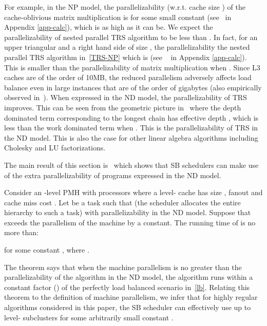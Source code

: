 For example, in the NP model, the parallelizability (w.r.t. cache size
) of the cache-oblivious matrix multiplication is  for some small constant 
(see~ in Appendix \ref{app-calc}), which is as high as
it can be. We expect the parallelizability of nested parallel TRS
algorithm to be less than . In fact, for an  upper triangular  and a right hand side  of size , the parallelizability the nested parallel TRS algorithm
in~\eqref{TRS-NP} which is  (see
~ in Appendix \ref{app-calc}). This is smaller than the
parallelizability of matrix multiplication when . Since L3
caches are of the order of 10MB, the reduced parallelism adversely
affects load balance even in large instances that are of the order of
gigabytes (also empirically observed in~\cite{SimhadriBlFi15}).  When
expressed in the ND model, the parallelizability of TRS improves.
This can be seen from the geometric picture
in~ where the depth dominated term
corresponding to the longest chain has effective depth
, which is less than the work
dominated term when .  This is the
parallelizability of TRS in the ND model.  This is also the case for
other linear algebra algorithms including Cholesky and LU
factorizations.

\vspace{3pt}
The main result of this section is~ which shows
that SB schedulers can make use of the extra parallelizability of
programs expressed in the ND model.
\begin{theorem}
\vspace{-3pt}
Consider an -level PMH with  processors where a level- cache
has size , fanout  and cache miss cost . Let  be a
task such that  (the scheduler allocates the
entire hierarchy to such a task) with parallelizability 
in the ND model. Suppose that  exceeds the parallelism
of the machine by a constant. The running time of  is no more than:

for some constant , where .
\label{thm:rt}
\end{theorem}

The theorem says that when the machine parallelism is no greater than
the parallelizability of the algorithm in the ND model, the algorithm
runs within a constant factor () of the perfectly load balanced
scenario in~\eqref{lb}.  Relating this theorem to the definition of
machine parallelism, we infer that for highly regular algorithms
considered in this paper, the SB scheduler can effectively use up to
 level- subclusters for some arbitrarily
small constant .

